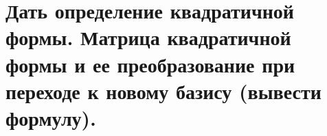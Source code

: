 \section{
    Дать определение квадратичной формы. Матрица квадратичной формы и ее преобразование при переходе к новому базису (вывести формулу).
}


